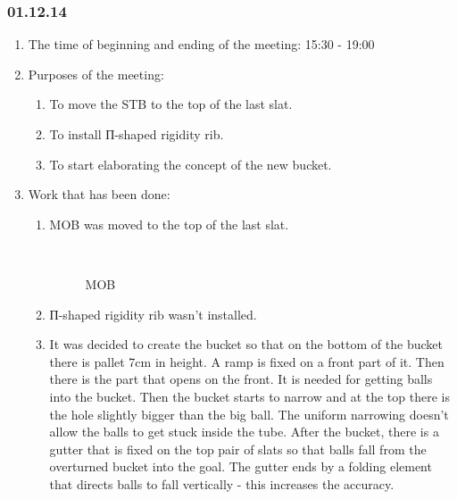 \subsubsection{01.12.14}

\begin{enumerate}
	\item The time of beginning and ending of the meeting:
	15:30 - 19:00
	\item Purposes of the meeting:
	\begin{enumerate}
	  \item To move the STB to the top of the last slat.
	  
	  \item To install П-shaped rigidity rib.
	  
	  \item To start elaborating the concept of the new bucket.
	  
    \end{enumerate}
	\item Work that has been done:
	\begin{enumerate}
	  \item MOB was moved to the top of the last slat.
	  
	  \begin{figure}[H]
	  	\begin{minipage}[h]{0.2\linewidth}
	  		\center  
	  	\end{minipage}
	  	\begin{minipage}[h]{0.6\linewidth}
	  		\caption{MOB}
	  	\end{minipage}
	  \end{figure}
	  
	  \item П-shaped rigidity rib wasn't installed.
	  
	  \item It was decided to create the bucket so that on the bottom of the bucket there is pallet 7cm in height. A ramp is fixed on a front part of it. Then there is the part that opens on the front. It is needed for getting balls into the bucket. Then the bucket starts to narrow and at the top there is the hole slightly bigger than the big ball. The uniform narrowing doesn't allow the balls to get stuck inside the tube. After the bucket, there is a gutter that is fixed on the top pair of slats so that balls fall from the overturned bucket into the goal. The gutter ends by a folding element that directs balls to fall vertically - this increases the accuracy.
	  

\end{enumerate}
\end{enumerate}
